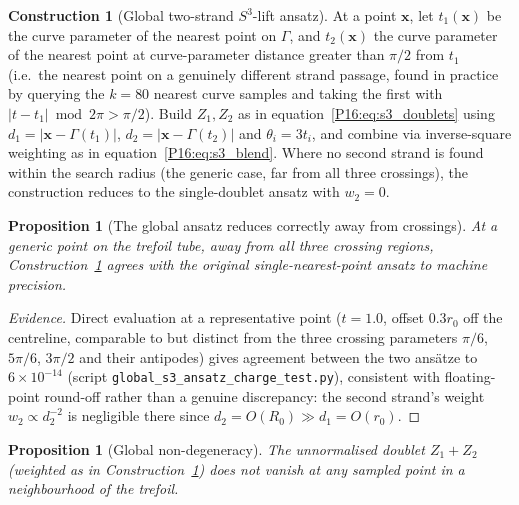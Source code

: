 \documentclass[11pt,a4paper]{article}
\newtheorem{proposition}[theorem]{Proposition}
\theoremstyle{definition}\newtheorem{definition}[theorem]{Definition}
\theoremstyle{remark}
\theoremstyle{definition}\newtheorem{construction}[theorem]{Construction}
\begin{document}
\begin{construction}[Global two-strand $S^3$-lift ansatz]
\label{P16:constr:global_s3lift}
At a point $\mathbf{x}$, let $t_1(\mathbf{x})$ be the curve parameter
of the nearest point on $\Gamma$, and $t_2(\mathbf{x})$ the curve
parameter of the nearest point at curve-parameter distance greater
than $\pi/2$ from $t_1$ (i.e.\ the nearest point on a genuinely
different strand passage, found in practice by querying the $k=80$
nearest curve samples and taking the first with
$|t-t_1|\bmod 2\pi>\pi/2$). Build $Z_1,Z_2$ as in
equation~\eqref{P16:eq:s3_doublets} using $d_1=|\mathbf{x}-\Gamma(t_1)|$,
$d_2=|\mathbf{x}-\Gamma(t_2)|$ and
$\theta_i=3t_i$, and combine via inverse-square weighting as in
equation~\eqref{P16:eq:s3_blend}. Where no second strand is found within
the search radius (the generic case, far from all three crossings),
the construction reduces to the single-doublet ansatz with $w_2=0$.
\end{construction}

\begin{proposition}[The global ansatz reduces correctly away from
  crossings]
\label{P16:prop:reduces_away}
At a generic point on the trefoil tube, away from all three crossing
regions, Construction~\ref{P16:constr:global_s3lift} agrees with the
original single-nearest-point ansatz to machine precision.
\end{proposition}

\begin{proof}[Evidence]
Direct evaluation at a representative point
($t=1.0$, offset $0.3r_0$ off the centreline, comparable to but
distinct from the three crossing parameters $\pi/6$, $5\pi/6$,
$3\pi/2$ and their antipodes) gives agreement between the two
ansätze to $6\times10^{-14}$ (script
\texttt{global\_s3\_ansatz\_charge\_test.py}), consistent with
floating-point round-off rather than a genuine discrepancy: the
second strand's weight $w_2\propto d_2^{-2}$ is negligible there
since $d_2=O(R_0)\gg d_1=O(r_0)$.
\end{proof}

\begin{proposition}[Global non-degeneracy]
\label{P16:prop:global_nondegen}
The unnormalised doublet $Z_1\!+\!Z_2$ (weighted as in
Construction~\ref{P16:constr:global_s3lift}) does not vanish at any
sampled point in a neighbourhood of the trefoil.
\end{proposition}
\end{document}
